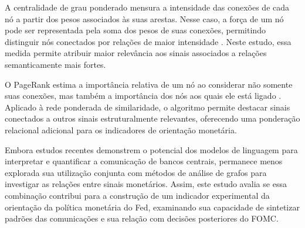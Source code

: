 A centralidade de grau ponderado mensura a intensidade das conexões de cada nó a partir 
dos pesos associados às suas arestas. Nesse caso, a força de um nó pode ser 
representada pela soma dos pesos de suas conexões, permitindo distinguir nós 
conectados por relações de maior intensidade \citep{barrat2004architecture}. 
Neste estudo, essa medida permite atribuir maior relevância aos sinais associados a 
relações semanticamente mais fortes.

O PageRank estima a importância relativa de um nó ao considerar não somente suas
conexões, mas também a importância dos nós aos quais ele está ligado \citep{page1999pagerank}. 
Aplicado à rede
ponderada de similaridade, o algoritmo permite destacar sinais conectados a outros
sinais estruturalmente relevantes, oferecendo uma ponderação relacional adicional
para os indicadores de orientação monetária.

Embora estudos recentes demonstrem o potencial dos modelos de linguagem para
interpretar e quantificar a comunicação de bancos centrais, permanece menos
explorada sua utilização conjunta com métodos de análise de grafos para investigar
as relações entre sinais monetários. Assim, este estudo avalia se essa combinação
contribui para a construção de um indicador experimental da orientação da política
monetária do Fed, examinando sua capacidade de sintetizar padrões das comunicações
e sua relação com decisões posteriores do FOMC.




